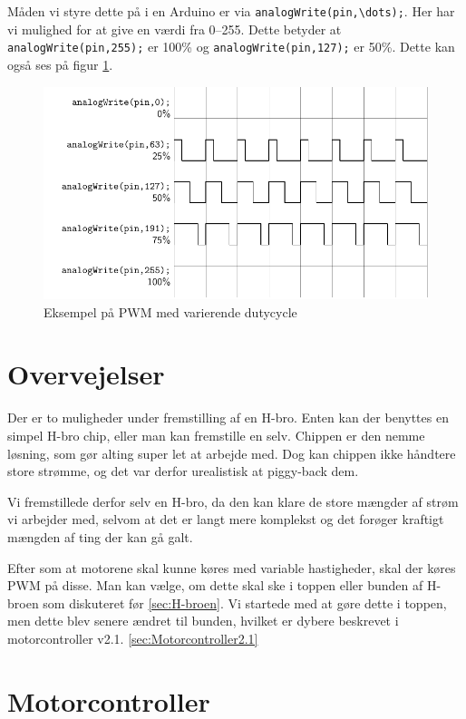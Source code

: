 \documentclass[a4paper,11pt,oneside,article,danish,table]{memoir}
\begin{document}
Måden vi styre dette på i en Arduino er via \lstinline{analogWrite(pin,\dots);}. Her har vi mulighed for at give en værdi fra 0--255. Dette betyder at \lstinline{analogWrite(pin,255);} er 100\% og \lstinline{analogWrite(pin,127);} er 50\%. Dette kan også ses på figur \ref{fig:pwm}.
\begin{figure}[htbp]
  \centering
  \includegraphics[width=\textwidth]{pictures/pwm.pdf}
  \caption{Eksempel på PWM med varierende dutycycle}
  \label{fig:pwm}
\end{figure}

\section{Overvejelser}
Der er to muligheder under fremstilling af en H-bro. Enten kan der benyttes en simpel H-bro chip, eller man kan fremstille en selv. Chippen er den nemme løsning, som gør alting super let at arbejde med. Dog kan chippen ikke håndtere store strømme, og det var derfor urealistisk at piggy-back dem.

Vi fremstillede derfor selv en H-bro, da den kan klare de store mængder af strøm vi arbejder med, selvom at det er langt mere komplekst og det forøger kraftigt mængden af ting der kan gå galt.

Efter som at motorene skal kunne køres med variable hastigheder, skal der køres PWM på disse. Man kan vælge, om dette skal ske i toppen eller bunden af H-broen som diskuteret før \ref{sec:H-broen}. Vi startede med at gøre dette i toppen, men dette blev senere ændret til bunden, hvilket er dybere beskrevet i motorcontroller v2.1. \ref{sec:Motorcontroller2.1}
\section{Motorcontroller}
\end{document}
